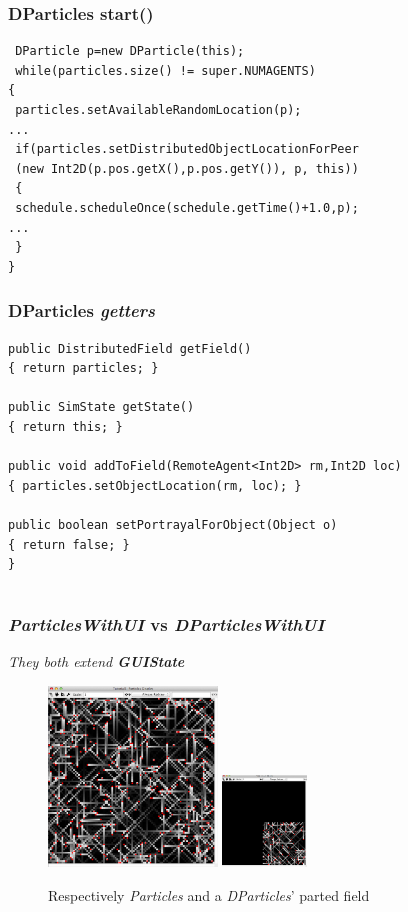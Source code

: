 \documentclass[]{beamer}
\begin{document}
\begin{frame}[fragile]
\frametitle{DParticles start()}
\begin{lstlisting}
 DParticle p=new DParticle(this);
 while(particles.size() != super.NUMAGENTS)
{
 particles.setAvailableRandomLocation(p);
...
 if(particles.setDistributedObjectLocationForPeer
 (new Int2D(p.pos.getX(),p.pos.getY()), p, this))
 {
 schedule.scheduleOnce(schedule.getTime()+1.0,p);
...
 }
}
\end{lstlisting}
\end{frame}

\begin{frame}[fragile]
\frametitle{DParticles \textit{getters}}
\begin{lstlisting}
public DistributedField getField()
{ return particles; }

public SimState getState()
{ return this; }

public void addToField(RemoteAgent<Int2D> rm,Int2D loc)
{ particles.setObjectLocation(rm, loc); }

public boolean setPortrayalForObject(Object o)
{ return false; }
}
\end{lstlisting}
\end{frame}

\section[GUI]{}

\begin{frame}
\frametitle{\textit{ParticlesWithUI} vs \textit{DParticlesWithUI}}
\textit{They both extend \textbf{GUIState}}
\begin{figure}
	\centering
		\includegraphics[width=0.4\textwidth]{part.png}
		\includegraphics[width=0.2\textwidth]{ppp.png}
		\caption{Respectively \textit{Particles} and a \textit{DParticles}' parted field}
	\label{fig:dp01}
\end{figure}
\end{frame}
\end{document}
